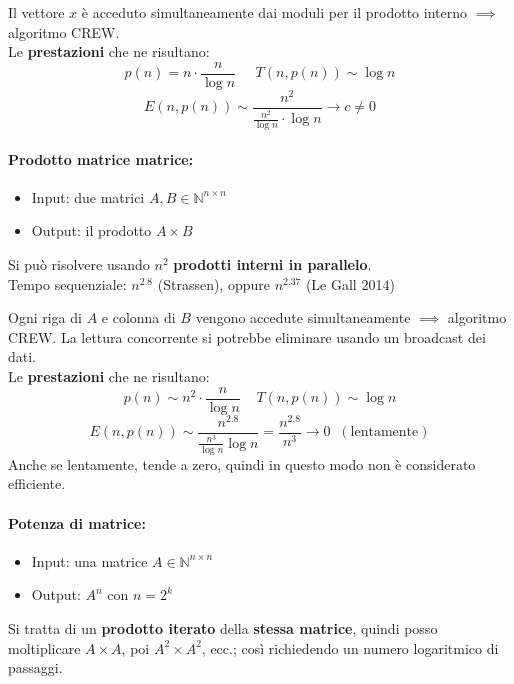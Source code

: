 \documentclass[11pt]{article}
\begin{document}
	Il vettore $x$ è acceduto simultaneamente dai moduli per il prodotto interno $\implies$ algoritmo CREW.\\
	
	Le \textbf{prestazioni} che ne risultano: 
	$$ p(n) = n \cdot \frac{n}{\log n} \;\;\;\;\; T(n, p(n)) \sim \log n $$
	$$ E (n, p(n)) \sim \frac{n^2}{\frac{n^2}{\log n} \cdot \log n} \rightarrow c \neq 0$$
	
	\newpage
	
	\paragraph{Prodotto matrice matrice:} 
	\begin{itemize}
		\item Input: due matrici $A,B \in \mathbb{N}^{n \times n}$
		\item Output: il prodotto $A \times B$
	\end{itemize}
	
	Si può risolvere usando $n^2$ \textbf{prodotti interni in parallelo}.\\
	
	Tempo sequenziale: $n^{2.8}$ (Strassen), oppure $n^{2.37}$ (Le Gall 2014)
	
	Ogni riga di $A$ e colonna di $B$ vengono accedute simultaneamente $\implies$ algoritmo CREW. La lettura concorrente si potrebbe eliminare usando un broadcast dei dati.\\
	
	Le \textbf{prestazioni} che ne risultano: 
	$$ p(n) \sim n^2 \cdot \frac{n}{\log n} \;\;\;\; T(n, p(n)) \sim \log n $$
	$$ E(n, p(n)) \sim \frac{n^{2.8}}{\frac{n^3}{\log n} \log n} = \frac{n^{2.8}}{n^3} \rightarrow 0 \;\;(\text{lentamente}) $$ 
	Anche se lentamente, tende a zero, quindi in questo modo non è considerato efficiente.\\
	
	\newpage
	
	\paragraph{Potenza di matrice:}
	\begin{itemize}
		\item Input: una matrice $A \in \mathbb{N}^{n \times n}$
		\item Output: $A^n$ con $n = 2^k$
	\end{itemize}
	
	Si tratta di un \textbf{prodotto iterato} della \textbf{stessa matrice}, quindi posso moltiplicare $A \times A$, poi $A^2 \times A^2$, ecc.; così richiedendo un numero logaritmico di passaggi.\\
	
\end{document}
